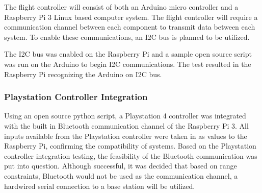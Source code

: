   The flight controller will consist of both an Arduino micro controller and a Raspberry Pi 3 Linux based computer system. The flight controller will require a communication channel between each component to transmit data between each system. To enable these communications, an I2C bus is planned to be utilized.
  
  The I2C bus was enabled on the Raspberry Pi and a sample open source script was run on the Arduino to begin I2C communications. The test resulted in the Raspberry Pi recognizing the Arduino on I2C bus.
  
  
  \subsubsection{Playstation Controller Integration}
  
  Using an open source python script, a Playstation 4 controller was integrated with the built in Bluetooth communication channel of the Raspberry Pi 3. All inputs available from the Playstation controller were taken in as values to the Raspberry Pi, confirming the compatibility of systems. Based on the Playstation controller integration testing, the feasibility of the Bluetooth communication was put into question. Although successful, it was decided that based on range constraints, Bluetooth would not be used as the communication channel, a hardwired serial connection to a base station will be utilized. 
